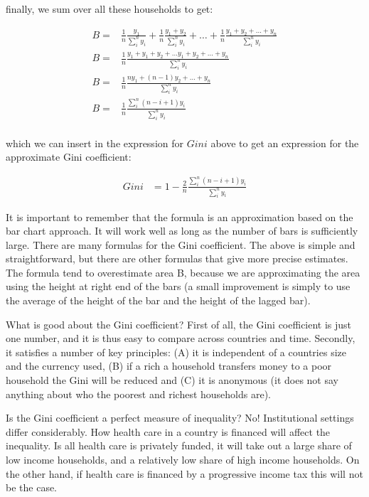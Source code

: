 \documentclass[]{book}
\begin{document}
finally, we sum over all these households to get:

\begin{align}
  B=&\frac{1}{n}\frac{y_1}{\sum_i^ny_i}+\frac{1}{n}\frac{y_1+y_2}{\sum_i^ny_i}+\dots+\frac{1}{n}\frac{y_1+y_2+\dots+y_n}{\sum_i^ny_i}\nonumber\\
  B=&\frac{1}{n}\frac{y_1+y_1+y_2+\dots y_1+y_2+\dots+y_n}{\sum_i^ny_i}\nonumber\\
  B=&\frac{1}{n}\frac{ny_1+(n-1)y_2+\dots+y_n}{\sum_i^ny_i}\nonumber\\
  B=&\frac{1}{n}\frac{\sum_i^n(n-i+1)y_i}{\sum_i^ny_i}\nonumber\\
\end{align}

which we can insert in the expression for \(Gini\) above to get an expression for the approximate Gini coefficient:

\begin{align}
    Gini&=1-\frac{2}{n}\frac{\sum_i^n(n-i+1)y_i}{\sum_i^ny_i}\nonumber
\end{align}

It is important to remember that the formula is an approximation based on the bar chart approach. It will work well as long as the number of bars is sufficiently large. There are many formulas for the Gini coefficient. The above is simple and straightforward, but there are other formulas that give more precise estimates. The formula tend to overestimate area B, because we are approximating the area using the height at right end of the bars (a small improvement is simply to use the average of the height of the bar and the height of the lagged bar).

What is good about the Gini coefficient? First of all, the Gini coefficient is just one number, and it is thus easy to compare across countries and time. Secondly, it satisfies a number of key principles: (A) it is independent of a countries size and the currency used, (B) if a rich a household transfers money to a poor household the Gini will be reduced and (C) it is anonymous (it does not say anything about who the poorest and richest households are).

Is the Gini coefficient a perfect measure of inequality? No! Institutional settings differ considerably. How health care in a country is financed will affect the inequality. Is all health care is privately funded, it will take out a large share of low income households, and a relatively low share of high income households. On the other hand, if health care is financed by a progressive income tax this will not be the case.
\end{document}

